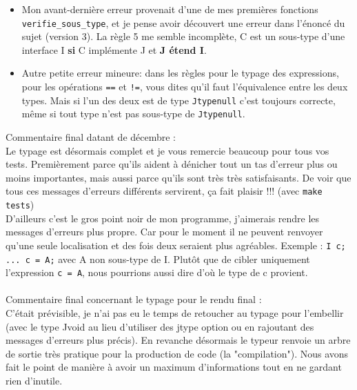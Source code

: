 \documentclass[12pt,a4paper]{report}
\begin{document}
\begin{itemize}
\item Mon avant-dernière erreur provenait d'une de mes premières fonctions \texttt{verifie\_sous\_type}, et je pense avoir découvert une erreur dans l'énoncé du sujet (version 3). La règle 5 me semble incomplète, C est un sous-type d'une interface I \textbf{si} C implémente J et \textbf{J étend I}.
\item Autre petite erreur mineure: dans les règles pour le typage des expressions, pour les opérations \texttt{==} et \texttt{!=}, vous dites qu'il faut l'équivalence entre les deux types. Mais si l'un des deux est de type \texttt{Jtypenull} c'est toujours correcte, même si tout type n'est pas sous-type de \texttt{Jtypenull}. 
\end{itemize}

\vspace{0.8cm}
\noindent Commentaire final datant de décembre : \\
Le typage est désormais complet et je vous remercie beaucoup pour tous vos tests. Premièrement parce qu'ils aident à dénicher tout un tas d'erreur plus ou moins importantes, mais aussi parce qu'ils sont très très satisfaisants. De voir que tous ces messages d'erreurs différents servirent, ça fait plaisir !!! (avec \texttt{make tests})\\ 
D'ailleurs c'est le gros point noir de mon programme, j'aimerais rendre les messages d'erreurs plus propre. Car pour le moment il ne peuvent renvoyer qu'une seule localisation et des fois deux seraient plus agréables. Exemple : \texttt{I c; ... c = A;} avec A non sous-type de I. Plutôt que de cibler uniquement l'expression \texttt{c = A}, nous pourrions aussi dire d'où le type de c provient. \\ \\
Commentaire final concernant le typage pour le rendu final : \\
C'était prévisible, je n'ai pas eu le temps de retoucher au typage pour l'embellir (avec le type Jvoid au lieu d'utiliser des jtype option ou en rajoutant des messages d'erreurs plus précis). En revanche désormais le typeur renvoie un arbre de sortie très pratique pour la production de code (la "compilation"). Nous avons fait le point de manière à avoir un maximum d'informations tout en ne gardant rien d'inutile. 
\end{document}
